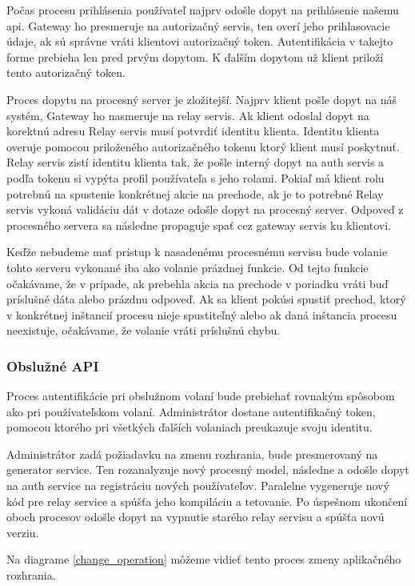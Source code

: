 Počas procesu prihlásenia používateľ najprv odošle dopyt na prihlásenie našemu \acrshort{api}.  Gateway ho presmeruje na autorizačný servis, ten overí jeho prihlasovacie údaje, ak sú správne vráti klientovi autorizačný token. Autentifikácia v takejto forme prebieha len pred prvým dopytom. K ďalším dopytom už klient priloží tento autorizačný token. 

Proces dopytu na procesný server je zložitejší. Najprv klient pošle dopyt na náš systém, Gateway ho nasmeruje na relay servis. Ak klient odoslal dopyt na korektnú adresu Relay servis musí potvrdiť identitu klienta. Identitu klienta overuje pomocou priloženého autorizačného tokenu ktorý klient musí poskytnuť. Relay servis zistí identitu klienta tak, že pošle interný dopyt na  auth servis a podľa tokenu si vypýta profil používateľa s jeho rolami.  Pokiaľ má klient rolu potrebnú na spustenie konkrétnej akcie na prechode, ak je to potrebné Relay servis vykoná validáciu dát  v dotaze odošle dopyt na procesný server.  Odpoveď z procesného servera sa následne propaguje spať cez gateway servis ku klientovi.
 
Keďže nebudeme mať prístup k nasadenému procesnému servisu bude volanie tohto serveru vykonané iba ako volanie prázdnej funkcie. Od tejto funkcie očakávame, že v prípade, ak prebehla akcia na prechode v poriadku vráti buď príslušné dáta alebo prázdnu odpoveď.  Ak sa klient pokúsi spustiť prechod, ktorý v konkrétnej inštancií procesu nieje spustiteľný alebo ak daná inštancia procesu neexistuje, očakávame, že volanie vráti príslušnú chybu. 

\subsubsection{Obslužné API}
Proces autentifikácie pri obslužnom volaní bude prebiehať rovnakým spôsobom ako pri  používateľskom volaní. Administrátor dostane autentifikačný token, pomocou ktorého pri všetkých ďalších volaniach preukazuje svoju identitu.

Administrátor zadá požiadavku na zmenu rozhrania, bude presmerovaný na generator service. Ten rozanalyzuje nový procesný model, následne a odošle dopyt na auth service na registráciu nových používateľov. Paralelne vygeneruje nový kód pre relay service a spúšťa jeho kompiláciu a tetovanie. Po úspešnom ukončení oboch procesov odošle dopyt na vypnutie starého relay servisu a spúšťa novú verziu.

Na diagrame \ref{change_operation} môžeme vidieť tento proces zmeny aplikačného rozhrania.

